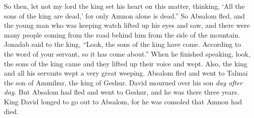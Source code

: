 \begin{biblechapter}
\verse So then, let not my lord the king set his heart on this matter, thinking, ‘All the sons of the king are dead,’ for only Amnon alone is dead.”
 So Absalom fled, and the young man who was keeping watch lifted up his eyes and saw, and there were many people coming from the road behind him from the side of the mountain.
\verse Jonadab said to the king, “Look, the sons of the king have come. According to the word of your servant, so it has come about.”
\verse When he finished speaking, look, the sons of the king came and they lifted up their voice and wept. Also, the king and all his servants wept a very great weeping.
\verse Absalom fled and went to Talmai the son of Ammihur, the king of Geshur. David mourned over his son \textit{day after day}.
\verse But Absalom had fled and went to Geshur, and he was there three years.
\verse King David longed to go out to Absalom, for he was consoled that Amnon had died.
\end{biblechapter}

